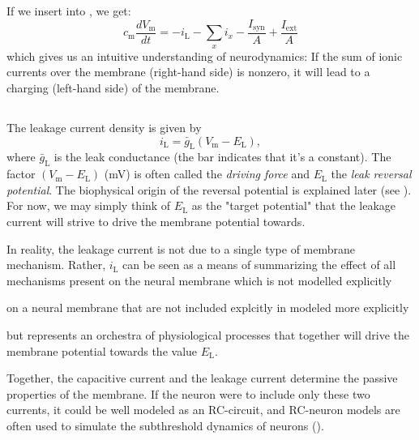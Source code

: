 If we insert  into , we get:
\begin{equation}
c_{\mathrm{m}} \frac{dV_\mathrm{m}}{dt} = -  i_{\mathrm{L}} - \sum_x{i_x} - \frac{I_{\mathrm{syn}}}{A} + \frac{I_{\mathrm{ext}}}{A}
\label{eq:Neuron:singlecomp_capinserted}
\end{equation}
which gives us an intuitive understanding of neurodynamics: If the sum of ionic currents over the membrane (right-hand side) is nonzero, it will lead to a charging (left-hand side) of the membrane.


\subsection{}
\label{sec:Neuron:leak}
The leakage current density is given by
\begin{equation}
i_{\mathrm{L}} = \bar{g}_{\mathrm{L}} (V_\mathrm{m} - E_{\mathrm{L}}),
\label{eq:Neuron:HHleak}
\end{equation}
where $\bar{g}_{\mathrm{L}}$ is the leak conductance (the bar indicates that it's a constant). The factor $(V_\mathrm{m} - E_{\mathrm{L}})$ (\si{\milli\volt}) is often called the \textit{driving force} and $E_{\mathrm{L}}$ the \textit{leak reversal potential}. The biophysical origin of the reversal potential is explained later (see ). For now, we may simply think of $E_{\mathrm{L}}$ as the "target potential" that the leakage current will strive to drive the membrane potential towards. 

In reality, the leakage current is not due to a single type of membrane mechanism. Rather, $i_{\mathrm{L}}$ can be seen as a means of summarizing the effect of all mechanisms present on the neural membrane which is not modelled explicitly 


on a neural membrane that are not included explcitly in 
modeled more explicitly


but represents an orchestra of physiological processes that together will drive the membrane potential towards the value $E_{\mathrm{L}}$. 

Together, the capacitive current and the leakage current determine the passive properties of the membrane. If the neuron were to include only these two currents, it could be well modeled as an RC-circuit, and RC-neuron models are often used to simulate the subthreshold dynamics of neurons (). 

